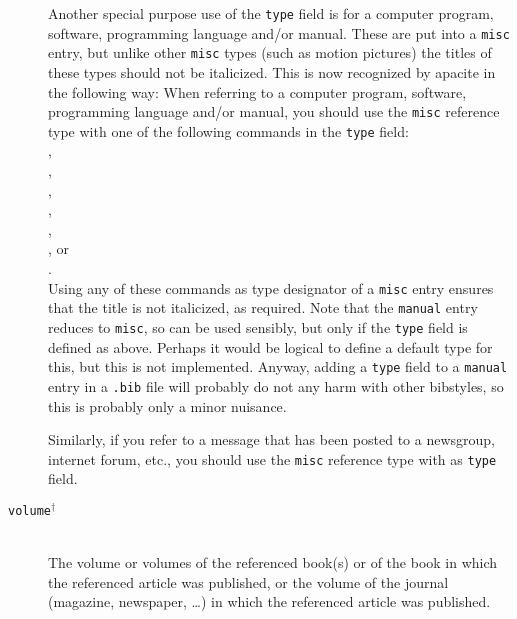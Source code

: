 \documentclass{article}
\newcommand{\LC}{\mbox{${}^{\dag}$}}%
\newcommand{\pkg}[1]{\textsf{#1}}%
\newcommand{\fname}[1]{\texttt{#1}}%
\newcommand{\fieldname}[1]{\texttt{#1}}%
\newcommand{\entryname}[1]{\texttt{#1}}%
\newcommand{\cmd}[1]{\texttt{\string#1}}%
\begin{document}
\begin{description}
        Another special purpose use of the \fieldname{type}
        field is for a computer program, software, programming
        language and/or manual. These are put into a \entryname{misc}
        entry, but unlike other \entryname{misc} types (such as
        motion pictures) the titles of these types should not
        be italicized. This is now recognized by \pkg{apacite}
        in the following way: When referring to a computer program,
        software, programming language and/or manual, you should
        use the \entryname{misc} reference type with
        one of the following commands in the \fieldname{type} field:\\
        \cmd{\bibcomputerprogram},\\
        \cmd{\bibcomputerprogrammanual},\\
        \cmd{\bibcomputerprogramandmanual},\\
        \cmd{\bibcomputersoftware},\\
        \cmd{\bibcomputersoftwaremanual},\\
        \cmd{\bibcomputersoftwareandmanual}, or\\
        \cmd{\bibprogramminglanguage}.\\
        Using any of these commands as type designator of a
        \entryname{misc} entry ensures that the title is not italicized,
        as required. Note that the \entryname{manual} entry reduces to
        \entryname{misc}, so can be used sensibly, but only if the
        \fieldname{type} field is defined as above. Perhaps it would
        be logical to define a default type for this, but this is not
        implemented. Anyway, adding a \fieldname{type} field to a
        \entryname{manual} entry in a \fname{.bib} file will probably
        do not any harm with other bibstyles, so this is probably only
        a minor nuisance.

        Similarly, if you refer to a message that has been posted to
        a newsgroup, internet forum, etc., you should use the
        \entryname{misc} reference type with \cmd{\bibmessage} as
        \fieldname{type} field.

    \item[\fieldname{volume}\LC] \mbox{}\\
        The volume or volumes of the referenced book(s) or
        of the book in which the referenced article was published,
        or the volume of the journal (magazine, newspaper, \ldots)
        in which the referenced article was published.


\end{description}
\end{document}
